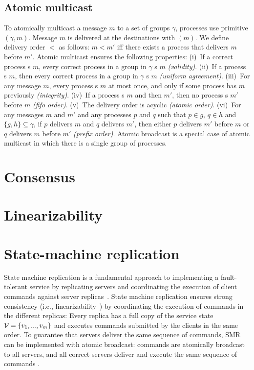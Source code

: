 \subsection{Atomic multicast} \label{sec:rmcast}

To atomically multicast a message $m$ to a set of groups $\gamma$, processes use
primitive \amcast$(\gamma, m)$.  Message $m$ is delivered at the destinations
with \amdel$(m)$.  We define delivery order $<$ as follows: $m < m'$ iff there
exists a process that delivers $m$ before $m'$. Atomic multicast ensures the
following properties: (i)~If a correct process \amcast{}s $m$, every correct
process in a group in $\gamma$ \amdel{}s $m$ \emph{(validity)}. (ii)~If a
process \amdel{}s $m$, then every correct process in a group in $\gamma$
\amdel{}s $m$ \emph{(uniform agreement)}. (iii)~For any message $m$, every
process \amdel{}s $m$ at most once, and only if some process has \amcast{} $m$
previously \emph{(integrity)}. (iv)~If a process \amcast{}s $m$ and then $m'$,
then no process \amdel{}s $m'$ before $m$ \emph{(fifo order)}. (v)~The delivery
order is acyclic \emph{(atomic order)}. (vi)~For any messages $m$ and $m'$ and
any processes $p$ and $q$ such that $p \in g$, $q \in h$ and $\{ g, h \}
\subseteq \gamma$, if $p$ delivers $m$ and $q$ delivers $m'$, then either $p$
delivers $m'$ before $m$ or $q$ delivers $m$ before $m'$ \emph{(prefix order)}.
Atomic broadcast is a special case of atomic multicast in which there is a
single group of processes.

\section{Consensus}
\lipsum[1-2]

\section{Linearizability}
\lipsum[1-2]

\section{State-machine replication}
\label{sec:smr}

State machine replication is a fundamental approach to implementing a
fault-tolerant service by replicating servers and coordinating the execution of
client commands against server replicas~\cite{Lam78,Sch90}. State machine
replication ensures strong consistency (i.e., linearizability~\cite{Attiya04})
by coordinating the execution of commands in the different replicas: Every
replica has a full copy of the service state $\mathcal{V} = \{v_1, ..., v_m\}$ and
executes commands submitted by the clients in the same order. To guarantee that
servers deliver the same sequence of commands, SMR can be implemented with
atomic broadcast: commands are atomically broadcast to all servers, and all
correct servers deliver and execute the same sequence of commands
\cite{BJ87b,DSU04}.
